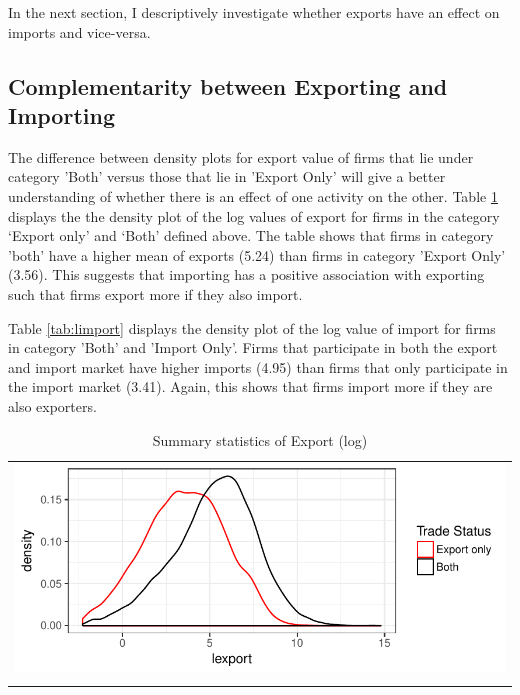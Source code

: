 \documentclass[12pt]{article}
\begin{document}
In the next section, I descriptively investigate whether exports have an effect
on imports and vice-versa.  

\subsection{Complementarity between Exporting and Importing}
The difference between density plots for export value of firms that
lie under category 'Both'  versus those that lie in 'Export Only' will
give a better understanding of whether there is an effect of one activity on the other. 
Table \ref{tab:lexport} displays the the density plot  of the log
values of export for firms in the category `Export only' and `Both'
defined above. The table shows that firms in category 'both'
 have a higher mean of exports (5.24) than firms in category 'Export
 Only' (3.56). This suggests that importing has a
positive association with exporting such that firms export more if
they also import.

Table \ref{tab:limport} displays the density plot of the log value of
import  for firms in category 'Both' and 'Import Only'.
Firms that participate in both the
export and import market have higher imports (4.95) than firms that only
participate in the import market (3.41). Again, this shows that firms
import more if they are also exporters. 

\begin{center}
\begin{table}[H]
\caption{Summary statistics of Export (log)}
\label{tab:lexport}
\begin{tabular}{c}
 \includegraphics{./PICS/denslexport.pdf}   \\ 
   \\  
\end{tabular}
\end{table}
\end{center}
\end{document}
